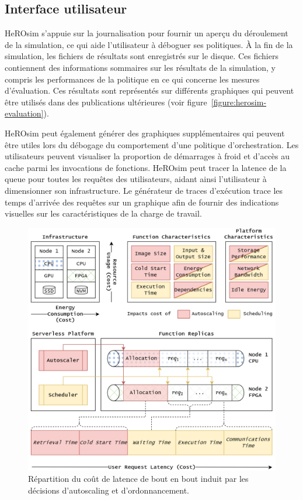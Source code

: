\subsection{Interface utilisateur}

HeROsim s'appuie sur la journalisation pour fournir un aperçu du déroulement de la simulation, ce qui aide l'utilisateur à déboguer ses politiques. À la fin de la simulation, les fichiers de résultats sont enregistrés sur le disque. Ces fichiers contiennent des informations sommaires sur les résultats de la simulation, y compris les performances de la politique en ce qui concerne les mesures d'évaluation. Ces résultats sont représentés sur différents graphiques qui peuvent être utilisés dans des publications ultérieures (voir figure~\ref{figure:herosim-evaluation}).

HeROsim peut également générer des graphiques supplémentaires qui peuvent être utiles lors du débogage du comportement d'une politique d'orchestration. Les utilisateurs peuvent visualiser la proportion de démarrages à froid et d'accès au cache parmi les invocations de fonctions. HeROsim peut tracer la latence de la queue pour toutes les requêtes des utilisateurs, aidant ainsi l'utilisateur à dimensionner son infrastructure. Le générateur de traces d'exécution trace les temps d'arrivée des requêtes sur un graphique afin de fournir des indications visuelles sur les caractéristiques de la charge de travail.

\begin{figure}[t]
    \centering
    \includegraphics[width=\columnwidth]{6_Chapitre6/figures/serverless-cost.png}
    \caption{Répartition du coût de latence de bout en bout induit par les décisions d'autoscaling et d'ordonnancement.}
\label{figure:herosim-cost}
\end{figure}

